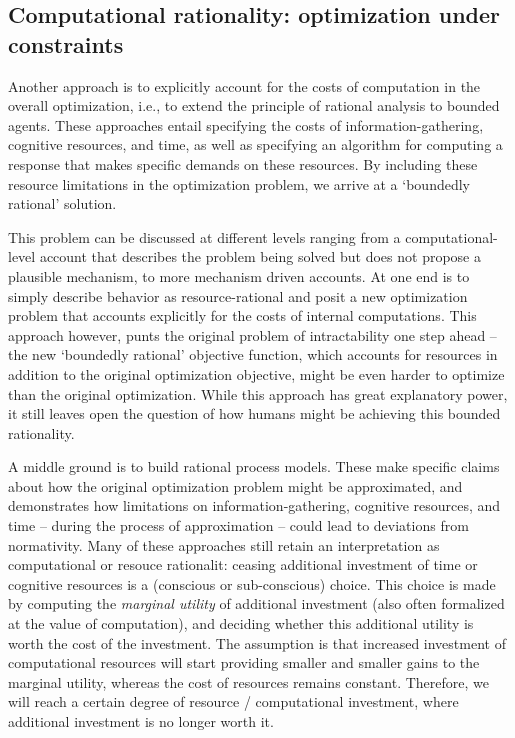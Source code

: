 \subsection{Computational rationality: optimization under constraints}

Another approach is to explicitly account for the costs of computation in the overall optimization, i.e., to extend the principle of rational analysis to bounded agents.
These approaches entail specifying the costs of information-gathering, cognitive resources, and time, as well as specifying an algorithm for computing a response that makes specific demands on these resources. By including these resource limitations in the optimization problem, we arrive at a `boundedly rational' solution.

This problem can be discussed at different levels ranging from a computational-level account that describes the problem being solved but does not propose a plausible mechanism, to more mechanism driven accounts. At one end is to simply describe behavior as resource-rational \citep{Vul2014, schulz2016simple} and posit a new optimization problem that accounts explicitly for the costs of internal computations. This approach however, punts the original problem of intractability one step ahead -- the new `boundedly rational' objective function, which accounts for resources in addition to the original optimization objective, might be even harder to optimize than the original optimization. While this approach has great explanatory power, it still leaves open the question of how humans might be achieving this bounded rationality.

A middle ground is to build rational process models\citep{griffiths2015, sanborn2010rational, dasgupta2017hypotheses}. These make specific claims about how the original optimization problem might be approximated, and demonstrates how limitations on information-gathering, cognitive resources, and time -- during the process of approximation -- could lead to deviations from normativity. Many of these approaches still retain an interpretation as computational or resouce rationalit: ceasing additional investment of time or cognitive resources is a (conscious or sub-conscious) choice. This choice is made by computing the \textit{marginal utility} of additional investment (also often formalized at the value of computation\citep{horvitz1989reflection}), and deciding whether this additional utility is worth the cost of the investment\cite{gershman15, griffiths2015}. The assumption is that increased investment of computational resources will start providing smaller and smaller gains to the marginal utility, whereas the cost of resources remains constant. Therefore, we will reach a certain degree of resource / computational investment, where additional investment is no longer worth it.

